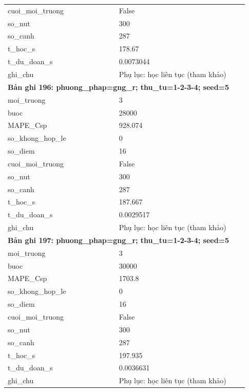 \begin{longtable}{p{0.43\linewidth}p{0.50\linewidth}}
cuoi\_\allowbreak moi\_\allowbreak truong & False \\
so\_\allowbreak nut & 300 \\
so\_\allowbreak canh & 287 \\
t\_\allowbreak hoc\_\allowbreak s & 178.67 \\
t\_\allowbreak du\_\allowbreak doan\_\allowbreak s & 0.0073044 \\
ghi\_\allowbreak chu & Phụ lục: học liên tục (tham khảo) \\
\midrule
\multicolumn{2}{p{0.95\linewidth}}{\textbf{Bản ghi 196: phuong\_phap=gng\_r; thu\_tu=1-2-3-4; seed=5}} \\
moi\_\allowbreak truong & 3 \\
buoc & 28000 \\
MAPE\_\allowbreak Csp & 928.074 \\
so\_\allowbreak khong\_\allowbreak hop\_\allowbreak le & 0 \\
so\_\allowbreak diem & 16 \\
cuoi\_\allowbreak moi\_\allowbreak truong & False \\
so\_\allowbreak nut & 300 \\
so\_\allowbreak canh & 287 \\
t\_\allowbreak hoc\_\allowbreak s & 187.667 \\
t\_\allowbreak du\_\allowbreak doan\_\allowbreak s & 0.0029517 \\
ghi\_\allowbreak chu & Phụ lục: học liên tục (tham khảo) \\
\midrule
\multicolumn{2}{p{0.95\linewidth}}{\textbf{Bản ghi 197: phuong\_phap=gng\_r; thu\_tu=1-2-3-4; seed=5}} \\
moi\_\allowbreak truong & 3 \\
buoc & 30000 \\
MAPE\_\allowbreak Csp & 1703.8 \\
so\_\allowbreak khong\_\allowbreak hop\_\allowbreak le & 0 \\
so\_\allowbreak diem & 16 \\
cuoi\_\allowbreak moi\_\allowbreak truong & False \\
so\_\allowbreak nut & 300 \\
so\_\allowbreak canh & 287 \\
t\_\allowbreak hoc\_\allowbreak s & 197.935 \\
t\_\allowbreak du\_\allowbreak doan\_\allowbreak s & 0.0036631 \\
ghi\_\allowbreak chu & Phụ lục: học liên tục (tham khảo) \\

\end{longtable}

